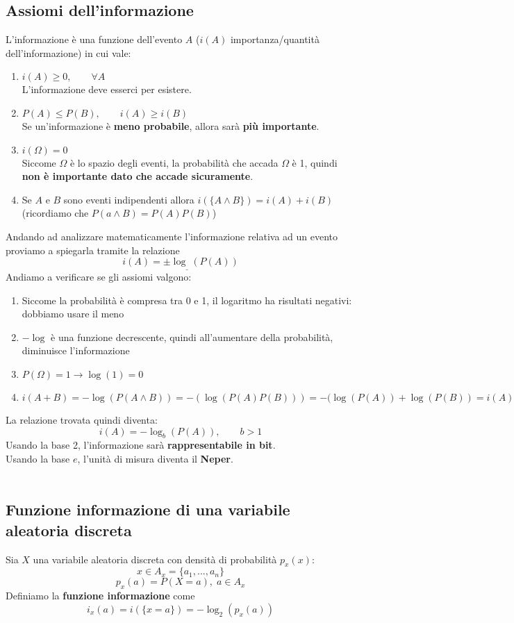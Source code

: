 \documentclass{article}
\begin{document}
\subsection{Assiomi dell'informazione}
L'informazione è una funzione dell'evento $A$ ($i(A)$ importanza/quantità dell'informazione) in cui vale:
\begin{enumerate}
	\item $i(A)\geq0,\qquad\forall A$\\
	L'informazione deve esserci per esistere.
	\item $P(A)\leq P(B),\qquad i(A)\geq i(B)$\\
	Se un'informazione è \textbf{meno probabile}, allora sarà \textbf{più importante}.
	\item $i(\Omega)=0$\\
	Siccome $\Omega$ è lo spazio degli eventi, la probabilità che accada $\Omega$ è 1, quindi \textbf{non è importante dato che accade sicuramente}.
	\item Se $A$ e $B$ sono eventi indipendenti allora $i(\{A\land B\})=i(A)+i(B)$ (ricordiamo che $P(a\land B)=P(A)P(B)$)
\end{enumerate}
Andando ad analizzare matematicamente l'informazione relativa ad un evento proviamo a spiegarla tramite la relazione
$$i(A)=\pm\log_{\_}(P(A))$$
Andiamo a verificare se gli assiomi valgono:
\begin{enumerate}
	\item Siccome la probabilità è compresa tra 0 e 1, il logaritmo ha risultati negativi: dobbiamo usare il meno
	\item $-\log$ è una funzione decrescente, quindi all'aumentare della probabilità, diminuisce l'informazione
	\item $P(\Omega)=1\rightarrow\log(1)=0$
	\item $i(A+B)=-\log(P(A\land B))=-(\log(P(A)P(B)))=-(\log(P(A))+\log(P(B))=i(A)+i(B)$
\end{enumerate}
La relazione trovata quindi diventa:
$$i(A)=-\log_b(P(A)),\qquad b>1$$
Usando la base 2, l'informazione sarà \textbf{rappresentabile in bit}.\\
Usando la base $e$, l'unità di misura diventa il \textbf{Neper}.\\\\

\subsection{Funzione informazione di una variabile aleatoria discreta}
Sia $X$ una variabile aleatoria discreta con densità di probabilità $p_x(x)$:
$$x\in A_x=\{a_1,...,a_n\}$$
$$p_x(a)=P(X=a),\;a\in A_x$$
Definiamo la \textbf{funzione informazione} come
$$i_x(a)=i(\{x=a\})=-\log_2(p_x(a))$$
\end{document}
